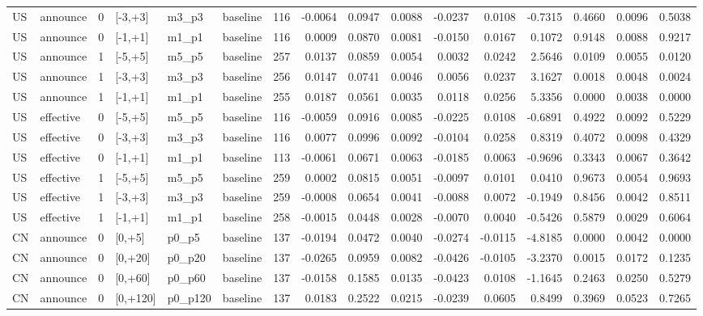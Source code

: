\begin{tabular}{llrlllrrrrrrrrrr}
US & announce & 0 & [-3,+3] & m3_p3 & baseline & 116 & -0.0064 & 0.0947 & 0.0088 & -0.0237 & 0.0108 & -0.7315 & 0.4660 & 0.0096 & 0.5038 \\
US & announce & 0 & [-1,+1] & m1_p1 & baseline & 116 & 0.0009 & 0.0870 & 0.0081 & -0.0150 & 0.0167 & 0.1072 & 0.9148 & 0.0088 & 0.9217 \\
US & announce & 1 & [-5,+5] & m5_p5 & baseline & 257 & 0.0137 & 0.0859 & 0.0054 & 0.0032 & 0.0242 & 2.5646 & 0.0109 & 0.0055 & 0.0120 \\
US & announce & 1 & [-3,+3] & m3_p3 & baseline & 256 & 0.0147 & 0.0741 & 0.0046 & 0.0056 & 0.0237 & 3.1627 & 0.0018 & 0.0048 & 0.0024 \\
US & announce & 1 & [-1,+1] & m1_p1 & baseline & 255 & 0.0187 & 0.0561 & 0.0035 & 0.0118 & 0.0256 & 5.3356 & 0.0000 & 0.0038 & 0.0000 \\
US & effective & 0 & [-5,+5] & m5_p5 & baseline & 116 & -0.0059 & 0.0916 & 0.0085 & -0.0225 & 0.0108 & -0.6891 & 0.4922 & 0.0092 & 0.5229 \\
US & effective & 0 & [-3,+3] & m3_p3 & baseline & 116 & 0.0077 & 0.0996 & 0.0092 & -0.0104 & 0.0258 & 0.8319 & 0.4072 & 0.0098 & 0.4329 \\
US & effective & 0 & [-1,+1] & m1_p1 & baseline & 113 & -0.0061 & 0.0671 & 0.0063 & -0.0185 & 0.0063 & -0.9696 & 0.3343 & 0.0067 & 0.3642 \\
US & effective & 1 & [-5,+5] & m5_p5 & baseline & 259 & 0.0002 & 0.0815 & 0.0051 & -0.0097 & 0.0101 & 0.0410 & 0.9673 & 0.0054 & 0.9693 \\
US & effective & 1 & [-3,+3] & m3_p3 & baseline & 259 & -0.0008 & 0.0654 & 0.0041 & -0.0088 & 0.0072 & -0.1949 & 0.8456 & 0.0042 & 0.8511 \\
US & effective & 1 & [-1,+1] & m1_p1 & baseline & 258 & -0.0015 & 0.0448 & 0.0028 & -0.0070 & 0.0040 & -0.5426 & 0.5879 & 0.0029 & 0.6064 \\
CN & announce & 0 & [0,+5] & p0_p5 & baseline & 137 & -0.0194 & 0.0472 & 0.0040 & -0.0274 & -0.0115 & -4.8185 & 0.0000 & 0.0042 & 0.0000 \\
CN & announce & 0 & [0,+20] & p0_p20 & baseline & 137 & -0.0265 & 0.0959 & 0.0082 & -0.0426 & -0.0105 & -3.2370 & 0.0015 & 0.0172 & 0.1235 \\
CN & announce & 0 & [0,+60] & p0_p60 & baseline & 137 & -0.0158 & 0.1585 & 0.0135 & -0.0423 & 0.0108 & -1.1645 & 0.2463 & 0.0250 & 0.5279 \\
CN & announce & 0 & [0,+120] & p0_p120 & baseline & 137 & 0.0183 & 0.2522 & 0.0215 & -0.0239 & 0.0605 & 0.8499 & 0.3969 & 0.0523 & 0.7265 \\

\end{tabular}
